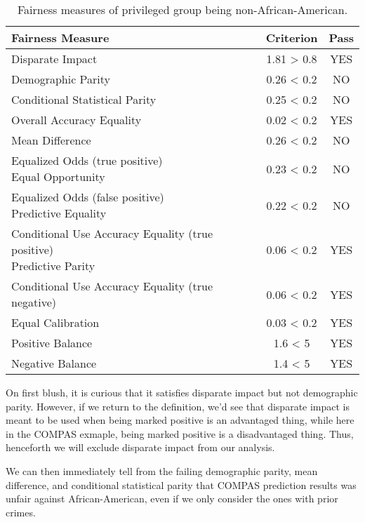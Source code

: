 \documentclass[conference]{IEEEtran}
\begin{document}
\begin{table}[h]
    \centering
    \begin{tabular}{|l|c|c|} %
        \hline
        \textbf{Fairness Measure} & \textbf{Criterion} & \textbf{Pass} \\
        \hline
Disparate Impact & 1.81 > 0.8 & YES \\
\hline
Demographic Parity & 0.26 < 0.2 & NO \\
\hline
Conditional Statistical Parity & 0.25 < 0.2 & NO \\
\hline
Overall Accuracy Equality & 0.02 < 0.2 & YES \\
\hline
Mean Difference & 0.26 < 0.2 & NO \\
\hline
\makecell[l]{Equalized Odds (true positive) \\ Equal Opportunity} & 0.23 < 0.2 & NO \\
\hline
\makecell[l]{Equalized Odds (false positive) \\ Predictive Equality} & 0.22 < 0.2 & NO \\
\hline
\makecell[l]{Conditional Use Accuracy Equality (true positive) \\ Predictive Parity} & 0.06 < 0.2 & YES \\
\hline
Conditional Use Accuracy Equality (true negative) & 0.06 < 0.2 & YES \\
\hline
Equal Calibration & 0.03 < 0.2 & YES \\
\hline
Positive Balance & 1.6 < 5 & YES \\
\hline
Negative Balance & 1.4 < 5 & YES \\
\hline
    \end{tabular}
    \caption{Fairness measures of privileged group being non-African-American.}
    \label{tab:results}
\end{table}

On first blush, it is curious that it satisfies disparate impact but not demographic parity. However, if we return to the definition, we'd see that disparate impact is meant to be used when being marked positive is an advantaged thing, while here in the COMPAS exmaple, being marked positive is a disadvantaged thing. Thus, henceforth we will exclude disparate impact from our analysis.

We can then immediately tell from the failing demographic parity, mean difference, and conditional statistical parity that COMPAS prediction results was unfair against African-American, even if we only consider the ones with prior crimes.
\end{document}
